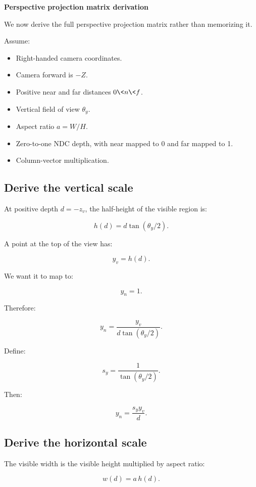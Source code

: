 \textbf{Perspective projection matrix derivation}

We now derive the full perspective projection matrix rather than memorizing it.

Assume:

\begin{itemize}
\tightlist
\item
  Right-handed camera coordinates.
\item
  Camera forward is \(-Z\).
\item
  Positive near and far distances \(0\<n\<f\).
\item
  Vertical field of view \(\theta_y\).
\item
  Aspect ratio \(a=W/H\).
\item
  Zero-to-one NDC depth, with near mapped to 0 and far mapped to 1.
\item
  Column-vector multiplication.
\end{itemize}

\subsection{Derive the vertical scale}\label{02-foundations-ii-ch033-derive-the-vertical-scale}

At positive depth \(d=-z_v\), the half-height of the visible region is:

\[
 h(d)=d\tan(\theta_y/2).
\]

A point at the top of the view has:

\[
 y_v=h(d).
\]

We want it to map to:

\[
 y_n=1.
\]

Therefore:

\[
 y_n= \frac{y_v}{d\tan(\theta_y/2)}.
\]

Define:

\[
 \boxed{ s_y=\frac1{\tan(\theta_y/2)} }.
\]

Then:

\[
 \boxed{ y_n=\frac{s_yy_v}{d} }.
\]

\subsection{Derive the horizontal scale}\label{02-foundations-ii-ch033-derive-the-horizontal-scale}

The visible width is the visible height multiplied by aspect ratio:

\[
 w(d)=a\,h(d).
\]

